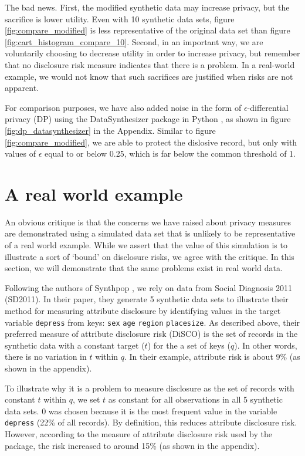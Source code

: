 \documentclass[runningheads]{llncs}
\begin{document}
The bad news.  First, the modified synthetic data may increase privacy, but the sacrifice is lower utility.  Even with 10 synthetic data sets, figure \ref{fig:compare_modified} is less representative of the original data set than figure \ref{fig:cart_histogram_compare_10}.  Second, in an important way, we are voluntarily choosing to decrease utility in order to increase privacy, but remember that no disclosure risk measure indicates that there is a problem.  In a real-world example, we would not know that such sacrifices are justified when risks are not apparent.

For comparison purposes, we have also added noise in the form of $\epsilon$-differential privacy (DP) using the DataSynthesizer package in Python \cite{ping2017datasynthesizer}, as shown in figure \ref{fig:dp_datasynthesizer} in the Appendix.  Similar to figure \ref{fig:compare_modified}, we are able to protect the dislosive record, but only with values of $\epsilon$ equal to or below 0.25, which is far below the common threshold of 1. 


\section{A real world example}

An obvious critique is that the concerns we have raised about privacy measures are demonstrated using a simulated data set that is unlikely to be representative of a real world example.  While we assert that the value of this simulation is to illustrate a sort of `bound' on disclosure risks, we agree with the critique.  In this section, we will demonstrate that the same problems exist in real world data.

Following the authors of Synthpop \cite{raab2024practical}, we rely on data from Social Diagnosis 2011 (SD2011).  In their paper, they generate 5 synthetic data sets to illustrate their method for measuring attribute disclosure by identifying values in the target variable \texttt{depress} from keys: \texttt{sex} \texttt{age} \texttt{region} \texttt{placesize}.  As described above, their preferred measure of attribute disclosure risk (DiSCO) is the set of records in the synthetic data with a constant target ($t$) for the a set of keys ($q$).  In other words, there is no variation in $t$ within $q$.  In their example, attribute risk is about 9\% (as shown in the appendix).  


To illustrate why it is a problem to measure disclosure as the set of records with constant $t$ within $q$, we set $t$ as constant for all observations in all 5 synthetic data sets.  0 was chosen because it is the most frequent value in the variable \texttt{depress} (22\% of all records).  By definition, this reduces attribute disclosure risk.  However, according to the measure of attribute disclosure risk used by the package, the risk increased to around 15\% (as shown in the appendix).
\end{document}
